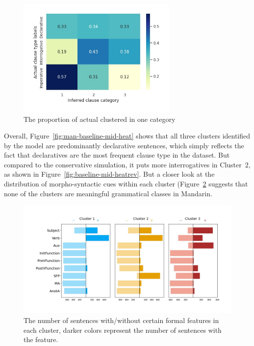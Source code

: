 \begin{figure}[H]
    \centering
    \includegraphics[width=0.7\textwidth]{figures/man-baseline-mid-heatrev.jpg}
    \caption{The proportion of actual \diis{} clustered in one category}
    \label{fig:man-baseline-mid-heatrev}
\end{figure}

Overall, Figure~\ref{fig:man-baseline-mid-heat} shows that all three clusters identified by the \dlearnerabbr{} model are predominantly declarative sentences, which simply reflects the fact that declaratives are the most frequent clause type in the dataset. But compared to the conservative simulation, it puts more interrogatives in Cluster~$2$, as shown in Figure~\ref{fig:baseline-mid-heatrev}. But a closer look at the distribution of morpho-syntactic cues within each cluster (Figure~\ref{fig:man-baseline-syncluster} suggests that none of the clusters are meaningful grammatical classes in Mandarin. %

\begin{figure}[H]
    \centering
    \includegraphics[width=1\textwidth]{figures/man-baseline-mid-syncluster.jpg}
    \caption{The number of sentences with/without certain formal features in each cluster, darker colors represent the number of sentences with the feature. }
    \label{fig:man-baseline-syncluster}
\end{figure}


